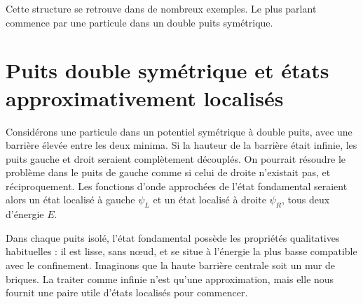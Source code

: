 Cette structure se retrouve dans de nombreux exemples. Le plus parlant commence par une particule dans un double puits symétrique.

\section{Puits double symétrique et états approximativement localisés}

Considérons une particule dans un potentiel symétrique à double puits, avec une barrière élevée entre les deux minima. Si la hauteur de la barrière était infinie, les puits gauche et droit seraient complètement découplés. On pourrait résoudre le problème dans le puits de gauche comme si celui de droite n’existait pas, et réciproquement. Les fonctions d’onde approchées de l’état fondamental seraient alors un état localisé à gauche \(\psi_L\) et un état localisé à droite \(\psi_R\), tous deux d’énergie \(E\).

Dans chaque puits isolé, l’état fondamental possède les propriétés qualitatives habituelles : il est lisse, sans nœud, et se situe à l’énergie la plus basse compatible avec le confinement. Imaginons que la haute barrière centrale soit un mur de briques. La traiter comme infinie n’est qu’une approximation, mais elle nous fournit une paire utile d’états localisés pour commencer.


